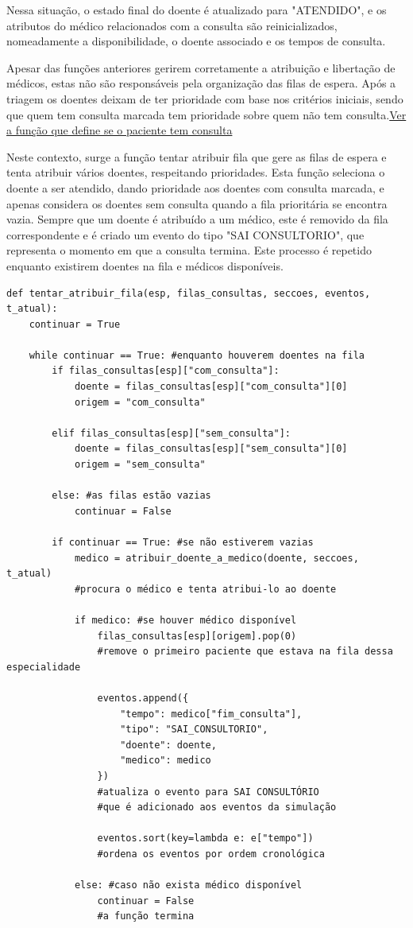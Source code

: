 \documentclass[12pt,a4paper]{article} %
\begin{document}
    Nessa situação, o estado final do doente é atualizado para "ATENDIDO", e os atributos do médico relacionados com a consulta são reinicializados, nomeadamente a disponibilidade, o doente associado e os tempos de consulta.

    Apesar das funções anteriores gerirem corretamente a atribuição e libertação de médicos, estas não são responsáveis pela organização das filas de espera. Após a triagem os doentes deixam de ter prioridade com base nos critérios iniciais, sendo que quem tem consulta marcada tem prioridade sobre quem não tem consulta.\hyperlink{temConsulta}{Ver a função que define se o paciente tem consulta}

    Neste contexto, surge a função tentar atribuir fila que gere as filas de espera e tenta atribuir vários doentes, respeitando prioridades. Esta função seleciona o doente a ser atendido, dando prioridade aos doentes com consulta marcada, e apenas considera os doentes sem consulta quando a fila prioritária se encontra vazia. Sempre que um doente é atribuído a um médico, este é removido da fila correspondente e é criado um evento do tipo "SAI CONSULTORIO", que representa o momento em que a consulta termina. Este processo é repetido enquanto existirem doentes na fila e médicos disponíveis.

\hypertarget{tenta_atribuir_fila}{}
\begin{verbatim}
def tentar_atribuir_fila(esp, filas_consultas, seccoes, eventos, t_atual):
    continuar = True

    while continuar == True: #enquanto houverem doentes na fila
        if filas_consultas[esp]["com_consulta"]:
            doente = filas_consultas[esp]["com_consulta"][0]
            origem = "com_consulta"

        elif filas_consultas[esp]["sem_consulta"]:
            doente = filas_consultas[esp]["sem_consulta"][0]
            origem = "sem_consulta"

        else: #as filas estão vazias
            continuar = False

        if continuar == True: #se não estiverem vazias
            medico = atribuir_doente_a_medico(doente, seccoes, t_atual)
            #procura o médico e tenta atribui-lo ao doente

            if medico: #se houver médico disponível
                filas_consultas[esp][origem].pop(0)
                #remove o primeiro paciente que estava na fila dessa especialidade

                eventos.append({
                    "tempo": medico["fim_consulta"],
                    "tipo": "SAI_CONSULTORIO",
                    "doente": doente,
                    "medico": medico
                })
                #atualiza o evento para SAI CONSULTÓRIO 
                #que é adicionado aos eventos da simulação

                eventos.sort(key=lambda e: e["tempo"])
                #ordena os eventos por ordem cronológica

            else: #caso não exista médico disponível
                continuar = False
                #a função termina
\end{verbatim}
\end{document}
